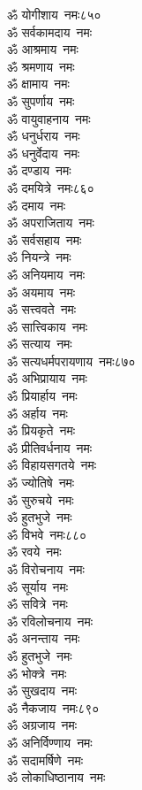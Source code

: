 \begin{multicols}{2}
\begin{flushleft}
ॐ योगीशाय~नमः\hfill ८५०\\
ॐ सर्वकामदाय~नमः\\
ॐ आश्रमाय~नमः\\
ॐ श्रमणाय~नमः\\
ॐ क्षामाय~नमः\\
ॐ सुपर्णाय~नमः\\
ॐ वायुवाहनाय~नमः\\
ॐ धनुर्धराय~नमः\\
ॐ धनुर्वेदाय~नमः\\
ॐ दण्डाय~नमः\\
ॐ दमयित्रे~नमः\hfill ८६०\\
ॐ दमाय~नमः\\
ॐ अपराजिताय~नमः\\
ॐ सर्वसहाय~नमः\\
ॐ नियन्त्रे~नमः\\
ॐ अनियमाय~नमः\\
ॐ अयमाय~नमः\\
ॐ सत्त्ववते~नमः\\
ॐ सात्त्विकाय~नमः\\
ॐ सत्याय~नमः\\
ॐ सत्यधर्मपरायणाय~नमः\hfill ८७०\\
ॐ अभिप्रायाय~नमः\\
ॐ प्रियार्हाय~नमः\\
ॐ अर्हाय~नमः\\
ॐ प्रियकृते~नमः\\
ॐ प्रीतिवर्धनाय~नमः\\
ॐ विहायसगतये~नमः\\
ॐ ज्योतिषे~नमः\\
ॐ सुरुचये~नमः\\
ॐ हुतभुजे~नमः\\
ॐ विभवे~नमः\hfill ८८०\\
ॐ रवये~नमः\\
ॐ विरोचनाय~नमः\\
ॐ सूर्याय~नमः\\
ॐ सवित्रे~नमः\\
ॐ रविलोचनाय~नमः\\
ॐ अनन्ताय~नमः\\
ॐ हुतभुजे~नमः\\
ॐ भोक्त्रे~नमः\\
ॐ सुखदाय~नमः\\
ॐ नैकजाय~नमः\hfill ८९०\\
ॐ अग्रजाय~नमः\\
ॐ अनिर्विण्णाय~नमः\\
ॐ सदामर्षिणे~नमः\\
ॐ लोकाधिष्ठानाय~नमः\\

\end{flushleft}
\end{multicols}
